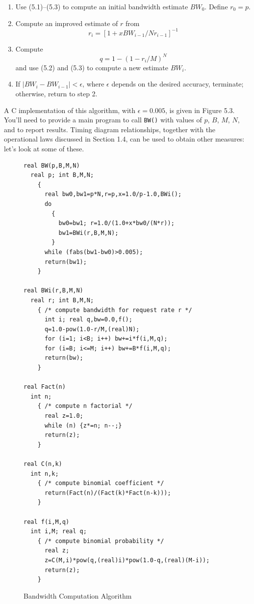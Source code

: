 \begin{enumerate}
\item Use (5.1)--(5.3) to compute an initial bandwidth estimate
$BW_0$. Define $r_0=p$.
\item Compute an improved estimate of $r$ from
\begin{equation}
r_i=[1+xBW_{i-1}/Nr_{i-1}]^{-1}
\end{equation}
\item Compute
\begin{equation}
q=1-(1-r_i/M)^N
\end{equation}
and use (5.2) and (5.3) to compute a new estimate $BW_i$.
\item If $|BW_i-BW_{i-1}|<\epsilon$, where $\epsilon$ depends on the desired
accuracy, terminate; otherwise, return to step 2.
\end{enumerate}

A C implementation of this algorithm, with $\epsilon=0.005$, is given in Figure 5.3.
You'll need to provide a main program to call \texttt{BW()} with values of $p$, $B$, $M$, $N$,
and to report results. Timing diagram relationships, together with the
operational laws discussed in Section 1.4, can be used to obtain other
measures: let's look at some of these.

\begin{figure}[p]
\centering
\begin{minipage}{.92\textwidth}
\begin{lstlisting}[basicstyle=\ttfamily\footnotesize]
real BW(p,B,M,N)
  real p; int B,M,N;
    {
      real bw0,bw1=p*N,r=p,x=1.0/p-1.0,BWi();
      do
        {
          bw0=bw1; r=1.0/(1.0+x*bw0/(N*r));
          bw1=BWi(r,B,M,N);
        }
      while (fabs(bw1-bw0)>0.005);
      return(bw1);
    }

real BWi(r,B,M,N)
  real r; int B,M,N;
    { /* compute bandwidth for request rate r */
      int i; real q,bw=0.0,f();
      q=1.0-pow(1.0-r/M,(real)N);
      for (i=1; i<B; i++) bw+=i*f(i,M,q);
      for (i=B; i<=M; i++) bw+=B*f(i,M,q);
      return(bw);
    }

real Fact(n)
  int n;
    { /* compute n factorial */
      real z=1.0;
      while (n) {z*=n; n--;}
      return(z);
    }

real C(n,k)
  int n,k;
    { /* compute binomial coefficient */
      return(Fact(n)/(Fact(k)*Fact(n-k)));
    }

real f(i,M,q)
  int i,M; real q;
    { /* compute binomial probability */
      real z;
      z=C(M,i)*pow(q,(real)i)*pow(1.0-q,(real)(M-i));
      return(z);
    }
\end{lstlisting}
\end{minipage}
\caption{Bandwidth Computation Algorithm}
\end{figure}

